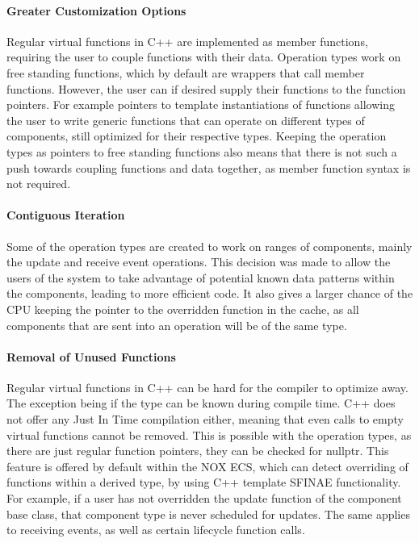 \paragraph{Greater Customization Options}
Regular virtual functions in C++ are implemented as member functions, requiring the user to couple functions with their data.
Operation types work on free standing functions, which by default are wrappers that call member functions.
However, the user can if desired supply their functions to the function pointers. 
For example pointers to template instantiations of functions allowing the user to write generic functions that can operate on different types of components, still optimized for their respective types.
Keeping the operation types as pointers to free standing functions also means that there is not such a push towards coupling functions and data together, as member function syntax is not required.

\paragraph{Contiguous Iteration}
Some of the operation types are created to work on ranges of components, mainly the update and receive event operations.
This decision was made to allow the users of the system to take advantage of potential known data patterns within the components, leading to more efficient code.
It also gives a larger chance of the CPU keeping the pointer to the overridden function in the cache, as all components that are sent into an operation will be of the same type.

\paragraph{Removal of Unused Functions}
Regular virtual functions in C++ can be hard for the compiler to optimize away. 
The exception being if the type can be known during compile time. 
C++ does not offer any Just In Time compilation either, meaning that even calls to empty virtual functions cannot be removed.
This is possible with the operation types, as there are just regular function pointers, they can be checked for nullptr.
This feature is offered by default within the NOX ECS, which can detect overriding of functions within a derived type, by using C++ template SFINAE functionality. 
For example, if a user has not overridden the update function of the component base class, that component type is never scheduled for updates. The same applies to receiving events, as well as certain lifecycle function calls.

